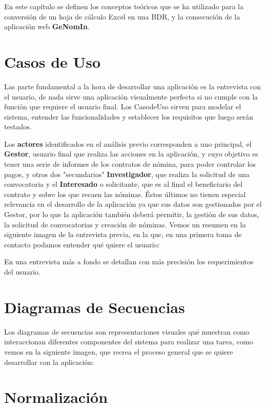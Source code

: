 
En este capítulo se definen los conceptos teóricos que se ha utilizado para la conversión de un hoja de cálculo Excel en una \acrfull{BDR}, y la consecución de la aplicación web \textbf{GeNomIn}.

\section{Casos de Uso}

Las parte fundamental a la hora de desarrollar una aplicación es la entrevista con el usuario, de nada sirve una aplicación visualmente perfecta si no cumple con la función que requiere el usuario final.
Los \gls{CasodeUso} sirven para modelar el sistema, entender las funcionalidades y establecer los requisitos que luego serán testados.

Los \textbf{actores} identificados en el análisis previo corresponden a uno principal, el \textbf{Gestor}, usuario final que realiza las acciones en la aplicación, y cuyo objetivo es tener una serie de informes de los contratos de nómina, para poder controlar los pagos, y otros dos "secundarios" \textbf{Investigador}, que realiza la solicitud de una convocatoria y el \textbf{Interesado} o solicitante, que es al final el beneficiario del contrato y sobre los que recaen las nóminas. Éstos últimos no tienen especial relevancia en el desarrollo de la aplicación ya que sus datos son gestionados por el Gestor, por lo que la aplicación también deberá permitir, la gestión de sus datos, la solicitud de convocatorias y creación de nóminas.
Vemos un resumen en la siguiente imagen de la entrevista previa, en la que, en una primera toma de contacto podamos entender qué quiere el usuario:

En una entrevista más a fondo se detallan con más precisión los requerimientos del usuario.
\imagenDos{}

\section{Diagramas de Secuencias}
Los diagramas de secuencias son representaciones visuales qué muestran como interaccionan diferentes componentes del sistema para realizar una tarea, como vemos en la siguiente imagen, que recrea el proceso general que se quiere desarrollar con la aplicación:

\section{Normalización}

